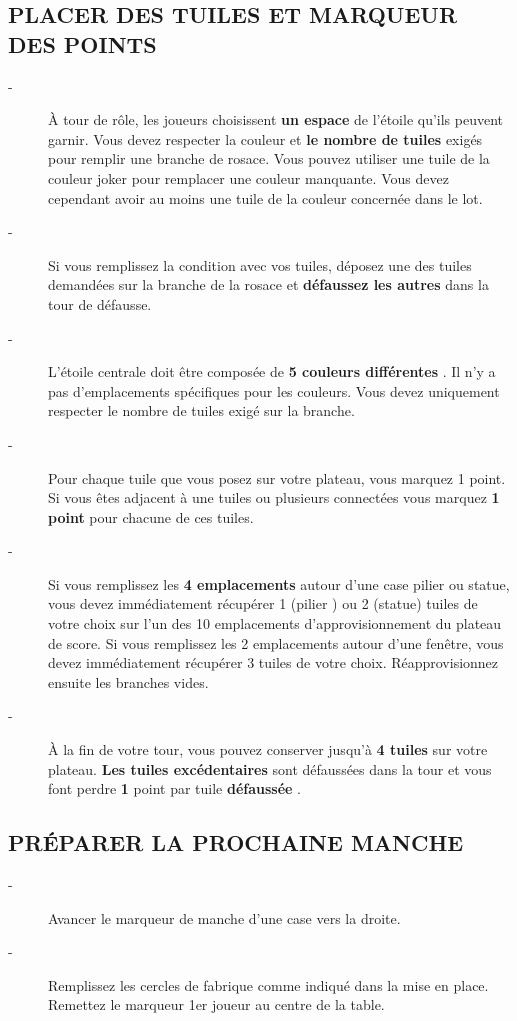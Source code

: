 \documentclass{scrartcl}%
\begin{document}
%
\subsection{ PLACER DES TUILES ET MARQUEUR DES POINTS
}%
\label{subsec:PLACERDESTUILESETMARQUEURDESPOINTS}%
\begin{description}%
\item[{-} ]%
%
 À tour de rôle, les joueurs choisissent %
\textbf{un espace}%
\textit{ }%
 de l'étoile qu'ils peuvent garnir. Vous devez respecter la couleur et %
\textbf{le nombre de tuiles}%
\textit{ }%
 exigés pour remplir une branche de rosace. Vous pouvez utiliser une tuile de la couleur joker pour remplacer une couleur manquante. Vous devez cependant avoir au moins une tuile de la couleur concernée dans le lot.
%
\item[{-} ]%
%
 Si vous remplissez la condition avec vos tuiles, déposez une des tuiles demandées sur la branche de la rosace et %
\textbf{défaussez les autres}%
\textit{ }%
 dans la tour de défausse.
%
\item[{-} ]%
%
 L'étoile centrale doit être composée de %
\textbf{5 couleurs différentes}%
. Il n'y a pas d'emplacements spécifiques pour les couleurs. Vous devez uniquement respecter le nombre de tuiles exigé sur la branche.
%
\item[{-} ]%
%
 Pour chaque tuile que vous posez sur votre plateau, vous marquez 1 point. Si vous êtes adjacent à une tuiles ou plusieurs connectées vous marquez %
\textbf{1 point}%
\textit{ }%
 pour chacune de ces tuiles.
%
\item[{-} ]%
%
 Si vous remplissez les %
\textbf{4 emplacements}%
\textit{ }%
 autour d'une case pilier ou statue, vous devez immédiatement récupérer 1 (pilier ) ou 2 (statue) tuiles de votre choix sur l'un des 10 emplacements d'approvisionnement du plateau de score. Si vous remplissez les 2 emplacements autour d'une fenêtre, vous devez immédiatement récupérer 3 tuiles de votre choix. Réapprovisionnez ensuite les branches vides.
%
\item[{-} ]%
%
 À la fin de votre tour, vous pouvez conserver jusqu'à %
\textbf{4 tuiles}%
\textit{ }%
 sur votre plateau.%
\textbf{ Les tuiles excédentaires}%
\textit{ }%
 sont défaussées dans la tour et vous font perdre %
\textbf{1}%
\textit{ }%
 point par tuile %
\textbf{défaussée}%
.
%
\end{description}

%
\subsection{ PRÉPARER LA PROCHAINE MANCHE
}%
\label{subsec:PRPARERLAPROCHAINEMANCHE}%
\begin{description}%
\item[{-} ]%
%
 Avancer le marqueur de manche d'une case vers la droite.
%
\item[{-} ]%
%
 Remplissez les cercles de fabrique comme indiqué dans la mise en place. Remettez le marqueur 1er joueur au centre de la table.
%
\end{description}
\end{document}
